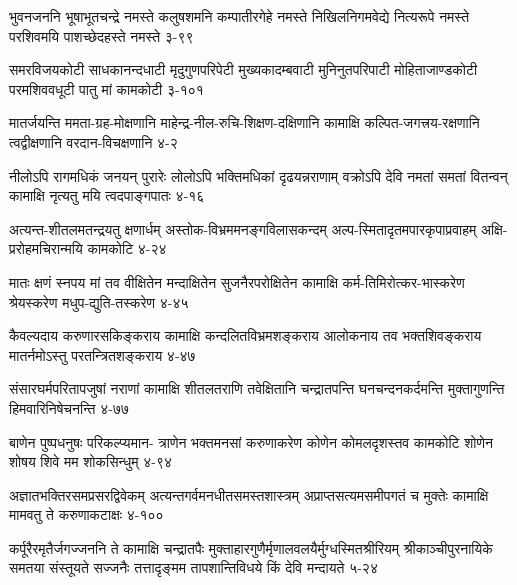 
\annofourlineindentedshloka
{भुवनजननि भूषाभूतचन्द्रे नमस्ते}
{कलुषशमनि कम्पातीरगेहे नमस्ते}
{निखिलनिगमवेद्ये नित्यरूपे नमस्ते}
{परशिवमयि पाशच्छेदहस्ते नमस्ते}
{३-९९}

\annofourlineindentedshloka
{समरविजयकोटी साधकानन्दधाटी}
{मृदुगुणपरिपेटी मुख्यकादम्बवाटी}
{मुनिनुतपरिपाटी मोहिताजाण्डकोटी}
{परमशिववधूटी पातु मां कामकोटी}
{३-१०१}




\annofourlineindentedshloka
{मातर्जयन्ति ममता-ग्रह-मोक्षणानि}
{माहेन्द्र-नील-रुचि-शिक्षण-दक्षिणानि}
{कामाक्षि कल्पित-जगत्त्रय-रक्षणानि}
{त्वद्वीक्षणानि वरदान-विचक्षणानि}
{४-२}

\annofourlineindentedshloka
{नीलोऽपि रागमधिकं जनयन् पुरारेः}
{लोलोऽपि भक्तिमधिकां दृढयन्नराणाम्}
{वक्रोऽपि देवि नमतां समतां वितन्वन्}
{कामाक्षि नृत्यतु मयि त्वदपाङ्गपातः}
{४-१६}

\annofourlineindentedshloka
{अत्यन्त-शीतलमतन्द्रयतु क्षणार्धम्}
{अस्तोक-विभ्रममनङ्गविलासकन्दम्}
{अल्प-स्मितादृतमपारकृपाप्रवाहम्}
{अक्षि-प्ररोहमचिरान्मयि कामकोटि}
{४-२४}


\annofourlineindentedshloka
{मातः क्षणं स्नपय मां तव वीक्षितेन}
{मन्दाक्षितेन सुजनैरपरोक्षितेन}
{कामाक्षि कर्म-तिमिरोत्कर-भास्करेण}
{श्रेयस्करेण मधुप-द्युति-तस्करेण}
{४-४५}

\annofourlineindentedshloka
{कैवल्यदाय करुणारसकिङ्कराय}
{कामाक्षि कन्दलितविभ्रमशङ्कराय}
{आलोकनाय तव भक्तशिवङ्कराय}
{मातर्नमोऽस्तु परतन्त्रितशङ्कराय}
{४-४७}

\annofourlineindentedshloka
{संसारघर्मपरितापजुषां नराणां}
{कामाक्षि शीतलतराणि तवेक्षितानि}
{चन्द्रातपन्ति घनचन्दनकर्दमन्ति}
{मुक्तागुणन्ति हिमवारिनिषेचनन्ति}
{४-७७}

\annofourlineindentedshloka
{बाणेन पुष्पधनुषः परिकल्प्यमान-}
{त्राणेन भक्तमनसां करुणाकरेण}
{कोणेन कोमलदृशस्तव कामकोटि}
{शोणेन शोषय शिवे मम शोकसिन्धुम्}
{४-९४}

\annofourlineindentedshloka
{अज्ञातभक्तिरसमप्रसरद्विवेकम्}
{अत्यन्तगर्वमनधीतसमस्तशास्त्रम्}
{अप्राप्तसत्यमसमीपगतं च मुक्तेः}
{कामाक्षि मामवतु ते करुणाकटाक्षः}
{४-१००}%




\annofourlineindentedshloka
{कर्पूरैरमृतैर्जगज्जननि ते कामाक्षि चन्द्रातपैः}
{मुक्ताहारगुणैर्मृणालवलयैर्मुग्धस्मितश्रीरियम्}
{श्रीकाञ्चीपुरनायिके समतया संस्तूयते सज्जनैः}
{तत्तादृङ्मम तापशान्तिविधये किं देवि मन्दायते}
{५-२४}

